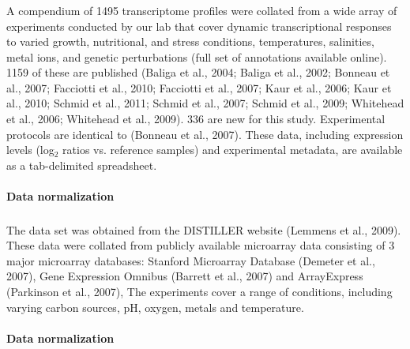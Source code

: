 \subsubsection{\halo}\label{halodata}

A compendium of 1495 transcriptome profiles were collated from a wide
array of experiments conducted by our lab that cover dynamic
transcriptional responses to varied growth, nutritional, and stress
conditions, temperatures, salinities, metal ions, and genetic
perturbations (full set of annotations available online). 1159 of
these are published (Baliga et al., 2004; Baliga et al., 2002; Bonneau
et al., 2007; Facciotti et al., 2010; Facciotti et al., 2007; Kaur et
al., 2006; Kaur et al., 2010; Schmid et al., 2011; Schmid et al.,
2007; Schmid et al., 2009; Whitehead et al., 2006; Whitehead et al.,
2009). 336 are new for this study. Experimental protocols are
identical to (Bonneau et al., 2007). These data, including expression
levels (log$_2$ ratios vs. reference samples) and experimental metadata,
are available as a tab-delimited spreadsheet.

\paragraph{Data normalization} %

\subsubsection{\eco}\label{ecodata}

The \eco data set was obtained from the DISTILLER website (Lemmens
et al., 2009). These data were collated from publicly available
microarray data consisting of 3 major microarray databases: Stanford
Microarray Database (Demeter et al., 2007), Gene Expression Omnibus
(Barrett et al., 2007) and ArrayExpress (Parkinson et al., 2007), The
experiments cover a range of conditions, including varying carbon
sources, pH, oxygen, metals and temperature.

\paragraph{Data normalization}
